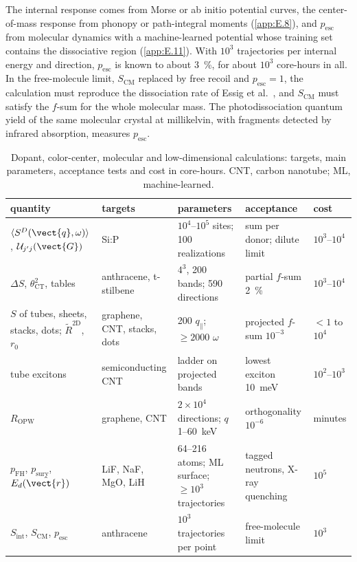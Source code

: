 The internal response comes from Morse or ab initio potential curves, the center-of-mass response from phonopy or path-integral moments (\cref{app:E.8}), and $p_{\mathrm{esc}}$ from molecular dynamics with a machine-learned potential whose training set contains the dissociative region (\cref{app:E.11}). With $10^3$ trajectories per internal energy and direction, $p_{\mathrm{esc}}$ is known to about \SI{3}{\percent}, for about $10^3$ core-hours in all. In the free-molecule limit, $S_{\mathrm{CM}}$ replaced by free recoil and $p_{\mathrm{esc}} = 1$, the calculation must reproduce the dissociation rate of Essig et al.~\cite{essig2017detection}, and $S_{\mathrm{CM}}$ must satisfy the $f$-sum for the whole molecular mass. The photodissociation quantum yield of the same molecular crystal at millikelvin, with fragments detected by infrared absorption, measures $p_{\mathrm{esc}}$.

\begin{table}[t]
  \centering
  \caption{Dopant, color-center, molecular and low-dimensional calculations: targets, main parameters, acceptance tests and cost in core-hours. CNT, carbon nanotube; ML, machine-learned.}
  \label{tab:E21-params}
  \small
  \setlength{\tabcolsep}{4pt}
  \begin{tabular}{p{}p{}p{}p{}p{}}
    \toprule
    quantity & targets & parameters & acceptance & cost \\
    \midrule
    $\langle S^D(\vect{q},\omega)\rangle$, $\mathcal{U}_{j'j}(\vect{G})$ & Si:P & $10^4$--$10^5$ sites; 100 realizations & sum per donor; dilute limit & $10^3$--$10^4$ \\
    $\Delta S$, $\theta^2_{\mathrm{CT}}$, tables & anthracene, t-stilbene & $4^3$, 200 bands; 590 directions & partial $f$-sum \SI{2}{\percent} & $10^3$--$10^4$ \\
    $S$ of tubes, sheets, stacks, dots; $\tilde R^{\mathrm{2D}}$, $r_0$ & graphene, CNT, stacks, dots & 200 $q_\parallel$; ${\ge}2000$ $\omega$ & projected $f$-sum $10^{-3}$ & ${<}1$ to $10^4$ \\
    tube excitons & semiconducting CNT & ladder on projected bands & lowest exciton \SI{10}{meV} & $10^2$--$10^3$ \\
    $R_{\mathrm{OPW}}$ & graphene, CNT & $2\times10^4$ directions; $q$ 1--\SI{60}{keV} & orthogonality $10^{-6}$ & minutes \\
    $p_{\mathrm{FH}}$, $p_{\mathrm{surv}}$, $E_d(\hat{\vect{r}})$ & LiF, NaF, MgO, LiH & 64--216 atoms; ML surface; ${\ge}10^3$ trajectories & tagged neutrons, X-ray quenching & $10^5$ \\
    $S_{\mathrm{int}}$, $S_{\mathrm{CM}}$, $p_{\mathrm{esc}}$ & anthracene & $10^3$ trajectories per point & free-molecule limit & $10^3$ \\
    \bottomrule
  \end{tabular}
\end{table}
